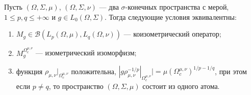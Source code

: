 \begin{proposition}\label{CoisomMultOpCharacBtwnTwoMeasSp} Пусть
$(\Omega,\Sigma,\mu)$, $(\Omega,\Sigma,\nu)$ --- два $\sigma$-конечных
пространства с мерой, $1\leq p,q\leq +\infty$ и $g\in L_0(\Omega,\Sigma)$. Тогда
следующие условия эквивалентны: 

\begin{enumerate}[label = (\roman*)]
    \item $M_g\in\mathcal{B}(L_p(\Omega,\mu), L_q(\Omega,\nu))$ --- 
    коизометрический оператор;

    \item $M_g^{\Omega_c^{\mu,\nu}}$ --- изометрический изоморфизм;

    \item функция $\rho_{\mu,\nu}|_{\Omega_c^{\mu,\nu}}$ положительна, 
    $|g \rho_{\mu,\nu}^{-1/p}|_{\Omega_c^{\mu,\nu}}|
    ={\mu(\Omega_c^{\mu,\nu})}^{1/p-1/q}$, при этом если $p\neq q$, 
    то пространство $(\Omega,\Sigma,\mu)$ состоит из одного атома.
\end{enumerate}
\end{proposition}
